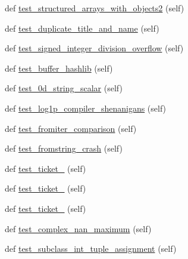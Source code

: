 \begin{DoxyCompactItemize}
\item 
def \hyperlink{classnumpy_1_1core_1_1tests_1_1test__regression_1_1TestRegression_a1898e833bbd6c7b9095d717af7e9181e}{test\+\_\+structured\+\_\+arrays\+\_\+with\+\_\+objects2} (self)
\item 
def \hyperlink{classnumpy_1_1core_1_1tests_1_1test__regression_1_1TestRegression_ae661de278e99a220267bdad03ee4b45f}{test\+\_\+duplicate\+\_\+title\+\_\+and\+\_\+name} (self)
\item 
def \hyperlink{classnumpy_1_1core_1_1tests_1_1test__regression_1_1TestRegression_ac077f79b8b1478e89b8ea1d352489c0f}{test\+\_\+signed\+\_\+integer\+\_\+division\+\_\+overflow} (self)
\item 
def \hyperlink{classnumpy_1_1core_1_1tests_1_1test__regression_1_1TestRegression_ae3942ec35ce4fce2cfdb64a1bbfbd8d5}{test\+\_\+buffer\+\_\+hashlib} (self)
\item 
def \hyperlink{classnumpy_1_1core_1_1tests_1_1test__regression_1_1TestRegression_a95b7258ff39edb45cf56c2008d10424c}{test\+\_\+0d\+\_\+string\+\_\+scalar} (self)
\item 
def \hyperlink{classnumpy_1_1core_1_1tests_1_1test__regression_1_1TestRegression_a53536853204d5ead4c88e65376dbc5fd}{test\+\_\+log1p\+\_\+compiler\+\_\+shenanigans} (self)
\item 
def \hyperlink{classnumpy_1_1core_1_1tests_1_1test__regression_1_1TestRegression_acff2bd9b80c1b212bdff572501225d24}{test\+\_\+fromiter\+\_\+comparison} (self)
\item 
def \hyperlink{classnumpy_1_1core_1_1tests_1_1test__regression_1_1TestRegression_a5959543d49f724baa4dd43127e3800d4}{test\+\_\+fromstring\+\_\+crash} (self)
\item 
def \hyperlink{classnumpy_1_1core_1_1tests_1_1test__regression_1_1TestRegression_ad613a7aff283771161bb7b0565561e7a}{test\+\_\+ticket\+\_} (self)
\item 
def \hyperlink{classnumpy_1_1core_1_1tests_1_1test__regression_1_1TestRegression_ad0d1ed5151d3f4c643e6de7c6bb94d8c}{test\+\_\+ticket\+\_} (self)
\item 
def \hyperlink{classnumpy_1_1core_1_1tests_1_1test__regression_1_1TestRegression_a6db5e63142897b68352b259122a0a30f}{test\+\_\+ticket\+\_} (self)
\item 
def \hyperlink{classnumpy_1_1core_1_1tests_1_1test__regression_1_1TestRegression_ae7bd6d434216e64e8839781ab8e3199c}{test\+\_\+complex\+\_\+nan\+\_\+maximum} (self)
\item 
def \hyperlink{classnumpy_1_1core_1_1tests_1_1test__regression_1_1TestRegression_a8fdeedac986c1af186847778e5a5a1dd}{test\+\_\+subclass\+\_\+int\+\_\+tuple\+\_\+assignment} (self)

\end{DoxyCompactItemize}
